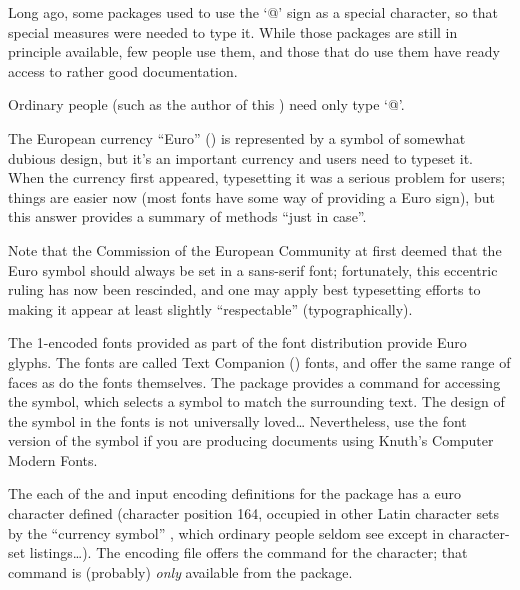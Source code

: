 
Long ago, some packages used to use the `@' sign as a special
character, so that special measures were needed to type it.  While
those packages are still in principle available, few people use them,
and those that do use them have ready access to rather good
documentation.

Ordinary people (such as the author of this ) need only type
`@'.


The European currency ``Euro'' (\texteuro {}) is represented by a symbol
of somewhat dubious design, but it's an important currency and
\AllTeX{} users need to typeset it.  When the currency first appeared,
typesetting it was a serious problem for \AllTeX{} users; things are
easier now (most fonts have some way of providing a Euro sign), but
this answer provides a summary of methods ``just in case''.

Note that the Commission of the European Community at first deemed
that the Euro symbol should always be set in a sans-serif font;
fortunately, this eccentric ruling has now been rescinded, and one may
apply best typesetting efforts to making it appear at least slightly
``respectable'' (typographically).

The 1-encoded  fonts provided as part of the  font
distribution provide Euro glyphs.  The fonts are called Text Companion
() fonts, and offer the same range
of faces as do the  fonts themselves.  The
 package provides a  command for
accessing the symbol, which selects a symbol to match the surrounding
text.  The design of the symbol in the  fonts is not
universally loved\dots{}
Nevertheless, use the  font version of the symbol if you are
producing documents using Knuth's Computer Modern Fonts.

The each of the  and  input encoding
definitions for the  package has a euro character
defined (character position 164, occupied in other  Latin
character sets by the ``currency symbol'' \textcurrency {}, which
ordinary people seldom see except in character-set listings\dots{}).
The  encoding file offers the command  for the
character; that command is (probably) \emph{only} available from the
 package.

